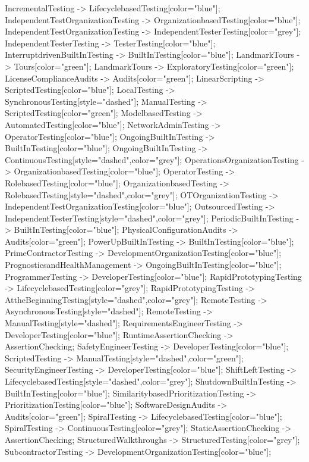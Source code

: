 \documentclass{article}
\begin{document}
{IncrementalTesting -> LifecyclebasedTesting[color="blue"];
IndependentTestOrganizationTesting -> OrganizationbasedTesting[color="blue"];
IndependentTestOrganizationTesting -> IndependentTesterTesting[color="grey"];
IndependentTesterTesting -> TesterTesting[color="blue"];
InterruptdrivenBuiltInTesting -> BuiltInTesting[color="blue"];
LandmarkTours -> Tours[color="green"];
LandmarkTours -> ExploratoryTesting[color="green"];
LicenseComplianceAudits -> Audits[color="green"];
LinearScripting -> ScriptedTesting[color="blue"];
LocalTesting -> SynchronousTesting[style="dashed"];
ManualTesting -> ScriptedTesting[color="green"];
ModelbasedTesting -> AutomatedTesting[color="blue"];
NetworkAdminTesting -> OperatorTesting[color="blue"];
OngoingBuiltInTesting -> BuiltInTesting[color="blue"];
OngoingBuiltInTesting -> ContinuousTesting[style="dashed",color="grey"];
OperationsOrganizationTesting -> OrganizationbasedTesting[color="blue"];
OperatorTesting -> RolebasedTesting[color="blue"];
OrganizationbasedTesting -> RolebasedTesting[style="dashed",color="grey"];
OTOrganizationTesting -> IndependentTestOrganizationTesting[color="blue"];
OutsourcedTesting -> IndependentTesterTesting[style="dashed",color="grey"];
PeriodicBuiltInTesting -> BuiltInTesting[color="blue"];
PhysicalConfigurationAudits -> Audits[color="green"];
PowerUpBuiltInTesting -> BuiltInTesting[color="blue"];
PrimeContractorTesting -> DevelopmentOrganizationTesting[color="blue"];
PrognosticsandHealthManagement -> OngoingBuiltInTesting[color="blue"];
ProgrammerTesting -> DeveloperTesting[color="blue"];
RapidPrototypingTesting -> LifecyclebasedTesting[color="grey"];
RapidPrototypingTesting -> AttheBeginningTesting[style="dashed",color="grey"];
RemoteTesting -> AsynchronousTesting[style="dashed"];
RemoteTesting -> ManualTesting[style="dashed"];
RequirementsEngineerTesting -> DeveloperTesting[color="blue"];
RuntimeAssertionChecking -> AssertionChecking;
SafetyEngineerTesting -> DeveloperTesting[color="blue"];
ScriptedTesting -> ManualTesting[style="dashed",color="green"];
SecurityEngineerTesting -> DeveloperTesting[color="blue"];
ShiftLeftTesting -> LifecyclebasedTesting[style="dashed",color="grey"];
ShutdownBuiltInTesting -> BuiltInTesting[color="blue"];
SimilaritybasedPrioritizationTesting -> PrioritizationTesting[color="blue"];
SoftwareDesignAudits -> Audits[color="green"];
SpiralTesting -> LifecyclebasedTesting[color="blue"];
SpiralTesting -> ContinuousTesting[color="grey"];
StaticAssertionChecking -> AssertionChecking;
StructuredWalkthroughs -> StructuredTesting[color="grey"];
SubcontractorTesting -> DevelopmentOrganizationTesting[color="blue"];
}
\end{document}
